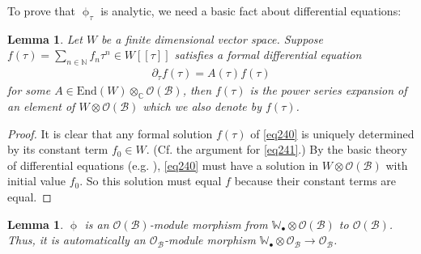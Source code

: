 \documentclass[11pt,b5paper,notitlepage]{article}
\theoremstyle{definition}
\theoremstyle{plain}
\newtheorem{lm}[df]{Lemma}
\newcommand{\mc}{\mathcal}
\newcommand{\End}{\mathrm{End}} %
\newcommand{\scr}{\mathscr}
\newcommand{\blt}{\bullet}
\newcommand{\Wbb}{\mathbb W}
\newcommand{\Cbb}{\mathbb C}
\newcommand{\Nbb}{\mathbb N}
\numberwithin{equation}{section}
\begin{document}
To prove that $\upphi_\tau$ is analytic, we need a basic fact about differential equations:

\begin{lm}\label{lb141}
Let $W$ be a finite dimensional vector space. Suppose $f(\tau)=\sum_{n\in\Nbb}f_n\tau^n\in W[[\tau]]$ satisfies a formal differential equation
\begin{align}
\partial_\tau f(\tau)=A(\tau)f(\tau)\label{eq240}
\end{align}
for some $A\in\End(W)\otimes_\Cbb\scr O(\mc B)$, then $f(\tau)$ is the power series expansion of an element of $W\otimes\scr O(\mc B)$ which we also denote by $f(\tau)$.
\end{lm}

\begin{proof}
It is clear that any formal solution $f(\tau)$ of \eqref{eq240} is uniquely determined by its constant term $f_0\in W$. (Cf. the argument for \eqref{eq241}.) By the basic theory of differential equations (e.g. \cite[Thm. B.1]{Kna}), \eqref{eq240} must have a solution in $W\otimes\scr O(\mc B)$ with initial value $f_0$. So this solution must equal $f$ because their constant terms are equal.
\end{proof}



\begin{lm}\label{lb142}
$\upphi$ is an $\scr O(\mc B)$-module morphism from $\Wbb_\blt\otimes\scr O(\mc B)$ to $\scr O(\mc B)$. Thus, it is automatically an $\scr O_{\mc B}$-module morphism $\Wbb_\blt\otimes\scr O_{\mc B}\rightarrow\scr O_{\mc B}$.
\end{lm}
\end{document}

